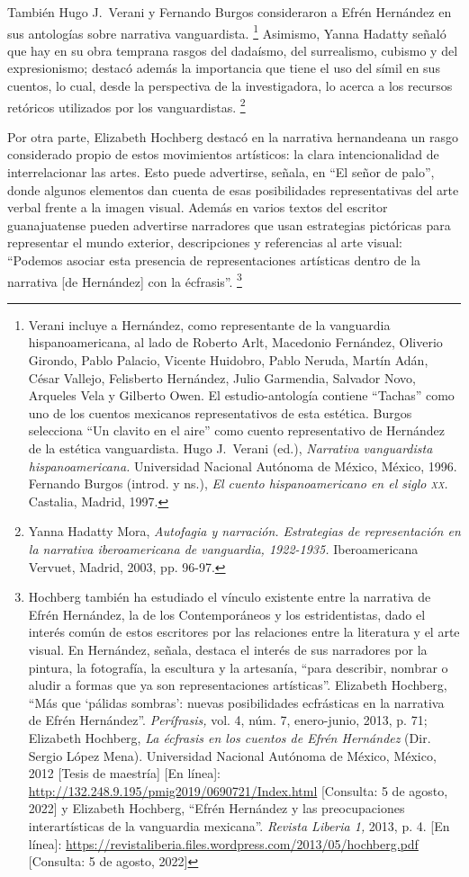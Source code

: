 \documentclass[14pt,twoside,final]{extbook} %
\let\oldfootnote\footnote
\renewcommand\footnote[1]{%
\oldfootnote{\hspace{1mm}#1}}
\begin{document}
También Hugo J.~Verani y Fernando Burgos consideraron a Efrén Hernández en sus antologías sobre narrativa vanguardista.\footnote{Verani incluye a Hernández, como representante de la vanguardia hispanoamericana, al lado de Roberto Arlt, Macedonio Fernández, Oliverio Girondo, Pablo Palacio, Vicente Huidobro, Pablo Neruda, Martín Adán, César Vallejo, Felisberto Hernández, Julio Garmendia, Salvador Novo, Arqueles Vela y Gilberto Owen. El estudio-antología contiene ``Tachas'' como uno de los cuentos mexicanos representativos de esta estética. Burgos selecciona ``Un clavito en el aire'' como cuento representativo de Hernández de la estética vanguardista. Hugo J.~Verani (ed.), \emph{Narrativa vanguardista hispanoamericana.} Universidad Nacional Autónoma de México, México, 1996. Fernando Burgos (introd. y ns.), \emph{El cuento hispanoamericano en el
siglo \textsc{xx}.} Castalia, Madrid, 1997.} Asimismo, Yanna Hadatty señaló que hay en su obra temprana rasgos del dadaísmo, del surrealismo, cubismo y del expresionismo; destacó además la importancia que tiene el uso del símil en sus cuentos, lo cual, desde la perspectiva de la investigadora, lo acerca a los recursos retóricos utilizados por los vanguardistas.\footnote{Yanna Hadatty Mora, \emph{Autofagia y narración. Estrategias de representación en la narrativa iberoamericana de vanguardia, 1922-1935.} Iberoamericana Vervuet, Madrid, 2003, pp. 96-97.}

Por otra parte, Elizabeth Hochberg destacó en la narrativa hernandeana un rasgo considerado propio de estos movimientos artísticos: la clara intencionalidad de interrelacionar las artes. Esto puede advertirse, señala, en ``El señor de palo'', donde algunos elementos dan cuenta de esas posibilidades representativas del arte verbal frente a la imagen visual. Además en varios textos del escritor guanajuatense pueden advertirse narradores que usan estrategias pictóricas para representar el mundo exterior, descripciones y referencias al arte visual: ``Podemos asociar esta presencia de representaciones artísticas dentro de la narrativa [de Hernández] con la écfrasis''.\footnote{Hochberg también ha estudiado el vínculo existente entre la narrativa de Efrén Hernández, la de los Contemporáneos y los estridentistas, dado el interés común de estos escritores por las relaciones entre la literatura y el arte visual. En Hernández, señala, destaca el interés de sus narradores por la pintura, la fotografía, la escultura y la artesanía, ``para describir, nombrar o aludir a formas que ya son representaciones artísticas''. Elizabeth Hochberg, ``Más que `pálidas sombras': nuevas posibilidades ecfrásticas en la narrativa de Efrén Hernández''. \emph{Perífrasis,} vol. 4, núm. 7, enero-junio, 2013, p. 71; Elizabeth Hochberg, \emph{La écfrasis en los cuentos de Efrén Hernández} (Dir. Sergio López Mena). Universidad Nacional Autónoma de México, México, 2012 [Tesis de maestría] [En línea]: \url{http://132.248.9.195/pmig2019/0690721/Index.html} [Consulta: 5 de agosto, 2022] y Elizabeth Hochberg, ``Efrén Hernández y las preocupaciones interartísticas de la vanguardia mexicana''. \emph{Revista Liberia 1,} 2013, p. 4. [En línea]: \url{https://revistaliberia.files.wordpress.com/2013/05/hochberg.pdf} [Consulta: 5 de agosto, 2022]}
\end{document}
